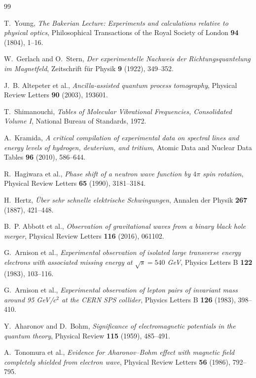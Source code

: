 \begin{thebibliography}{99}

T.~Young,
\emph{The Bakerian Lecture: Experiments and calculations relative to physical
optics},
Philosophical Transactions of the Royal Society of London \textbf{94}
(1804), 1--16.

W.~Gerlach and O.~Stern,
\emph{Der experimentelle Nachweis der Richtungsquantelung im Magnetfeld},
Zeitschrift f{\"u}r Physik \textbf{9} (1922), 349--352.

J.~B. Altepeter et al.,
\emph{Ancilla-assisted quantum process tomography},
Physical Review Letters \textbf{90} (2003), 193601.

T.~Shimanouchi,
\emph{Tables of Molecular Vibrational Frequencies, Consolidated Volume I},
National Bureau of Standards, 1972.

A.~Kramida,
\emph{A critical compilation of experimental data on spectral lines and
energy levels of hydrogen, deuterium, and tritium},
Atomic Data and Nuclear Data Tables \textbf{96} (2010), 586--644.

R.~Hagiwara et al.,
\emph{Phase shift of a neutron wave function by \(4\pi\) spin rotation},
Physical Review Letters \textbf{65} (1990), 3181--3184.

H.~Hertz,
\emph{\"Uber sehr schnelle elektrische Schwingungen},
Annalen der Physik \textbf{267} (1887), 421--448.

B.~P. Abbott et al.,
\emph{Observation of gravitational waves from a binary black hole merger},
Physical Review Letters \textbf{116} (2016), 061102.

G.~Arnison et al.,
\emph{Experimental observation of isolated large transverse energy electrons
with associated missing energy at \(\sqrt{s}=540\) GeV},
Physics Letters B \textbf{122} (1983), 103--116.

G.~Arnison et al.,
\emph{Experimental observation of lepton pairs of invariant mass around
95 GeV/\(c^2\) at the CERN SPS collider},
Physics Letters B \textbf{126} (1983), 398--410.

Y.~Aharonov and D.~Bohm,
\emph{Significance of electromagnetic potentials in the quantum theory},
Physical Review \textbf{115} (1959), 485--491.

A.~Tonomura et al.,
\emph{Evidence for Aharonov--Bohm effect with magnetic field completely
shielded from electron wave},
Physical Review Letters \textbf{56} (1986), 792--795.


\end{thebibliography}
